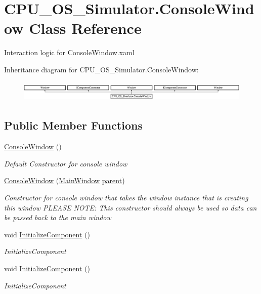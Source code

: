 \hypertarget{class_c_p_u___o_s___simulator_1_1_console_window}{}\section{C\+P\+U\+\_\+\+O\+S\+\_\+\+Simulator.\+Console\+Window Class Reference}
\label{class_c_p_u___o_s___simulator_1_1_console_window}


Interaction logic for Console\+Window.\+xaml  


Inheritance diagram for C\+P\+U\+\_\+\+O\+S\+\_\+\+Simulator.\+Console\+Window\+:\begin{figure}[H]
\begin{center}
\leavevmode
\includegraphics[height=1.004484cm]{class_c_p_u___o_s___simulator_1_1_console_window}
\end{center}
\end{figure}
\subsection*{Public Member Functions}
\begin{DoxyCompactItemize}
\item 
\hyperlink{class_c_p_u___o_s___simulator_1_1_console_window_abdd222b591f72c19297dc5805059ee7e}{Console\+Window} ()
\begin{DoxyCompactList}\small\item\em Default Constructor for console window \end{DoxyCompactList}\item 
\hyperlink{class_c_p_u___o_s___simulator_1_1_console_window_a4e79b8ceea62fb4bb44c63b7fdd7c6bb}{Console\+Window} (\hyperlink{class_c_p_u___o_s___simulator_1_1_main_window}{Main\+Window} \hyperlink{class_c_p_u___o_s___simulator_1_1_console_window_a1e38326bb40f4ed44c4964d94dc6f809}{parent})
\begin{DoxyCompactList}\small\item\em Constructor for console window that takes the window instance that is creating this window P\+L\+E\+A\+S\+E N\+O\+T\+E\+: This constructor should always be used so data can be passed back to the main window \end{DoxyCompactList}\item 
void \hyperlink{class_c_p_u___o_s___simulator_1_1_console_window_a5961ed9b274d16fab841f34bc178b52f}{Initialize\+Component} ()
\begin{DoxyCompactList}\small\item\em Initialize\+Component \end{DoxyCompactList}\item 
void \hyperlink{class_c_p_u___o_s___simulator_1_1_console_window_a5961ed9b274d16fab841f34bc178b52f}{Initialize\+Component} ()
\begin{DoxyCompactList}\small\item\em Initialize\+Component \end{DoxyCompactList}\end{DoxyCompactItemize}
